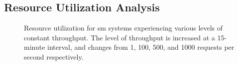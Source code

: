 \subsection{Resource Utilization Analysis}
\label{sec:experiments:results:per-experiment:02:resource}

\begin{figure}
\centering
{}
\caption[Resource utilization for \gls{sm} systems under load]{Resource utilization for \gls{sm} systems experiencing various levels of constant throughput. The level of throughput is increased at a 15-minute interval, and changes from  1, 100, 500, and 1000 requests per second respectively.}
\label{fig:exp:02:resource-utilization}
\end{figure}

